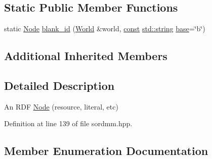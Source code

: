 \subsection*{Static Public Member Functions}
\begin{DoxyCompactItemize}
\item 
static \hyperlink{class_sord_1_1_node}{Node} \hyperlink{class_sord_1_1_node_ab4fe216e72008bb5702a7b0241ab00bb}{blank\+\_\+id} (\hyperlink{class_sord_1_1_world}{World} \&world, \hyperlink{getopt1_8c_a2c212835823e3c54a8ab6d95c652660e}{const} \hyperlink{test__lib_f_l_a_c_2format_8c_ab02026ad0de9fb6c1b4233deb0a00c75}{std\+::string} \hyperlink{lib_2expat_8h_a938e186c531ea86ae9adf3c0a649d8fc}{base}=\char`\"{}b\char`\"{})
\end{DoxyCompactItemize}
\subsection*{Additional Inherited Members}


\subsection{Detailed Description}
An R\+DF \hyperlink{class_sord_1_1_node}{Node} (resource, literal, etc) 

Definition at line 139 of file sordmm.\+hpp.



\subsection{Member Enumeration Documentation}
